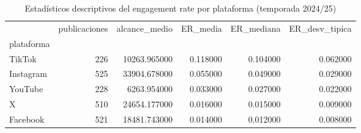 \begin{table}
\caption{Estadísticos descriptivos del engagement rate por plataforma (temporada 2024/25)}
\label{tab:engagement_plataforma}
\begin{tabular}{lrrrrr}
\toprule
 & publicaciones & alcance\_medio & ER\_media & ER\_mediana & ER\_desv\_tipica \\
plataforma &  &  &  &  &  \\
\midrule
TikTok & 226 & 10263.965000 & 0.118000 & 0.104000 & 0.062000 \\
Instagram & 525 & 33904.678000 & 0.055000 & 0.049000 & 0.029000 \\
YouTube & 228 & 6263.954000 & 0.033000 & 0.027000 & 0.022000 \\
X & 510 & 24654.177000 & 0.016000 & 0.015000 & 0.009000 \\
Facebook & 521 & 18481.743000 & 0.014000 & 0.012000 & 0.008000 \\
\bottomrule
\end{tabular}
\end{table}
